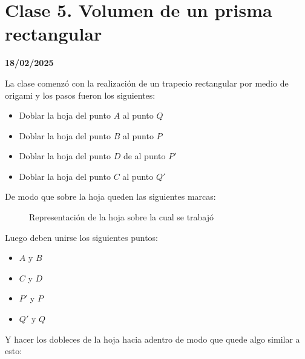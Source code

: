 \section{Clase 5. Volumen de un prisma rectangular}\label{chap:C5}
\textbf{18/02/2025}

La clase comenzó con la realización de un trapecio rectangular por medio de origami y los pasos fueron los siguientes:
\begin{itemize}
    \item Doblar la hoja del punto $A$ al punto $Q$
    \item Doblar la hoja del punto $B$ al punto $P$
    \item Doblar la hoja del punto $D$ de al punto $P'$
    \item Doblar la hoja del punto $C$ al punto $Q'$
\end{itemize}

De modo que sobre la hoja queden las siguientes marcas:

\begin{figure}[h!]
    \caption{Representación de la hoja sobre la cual se trabajó}
    \begin{center}
    \end{center}
\end{figure}

Luego deben unirse los siguientes puntos: 

\begin{itemize}
    \item $A$ y $B$
    \item $C$ y $D$
    \item $P'$ y $P$
    \item $Q'$ y $Q$
\end{itemize}
Y hacer los dobleces de la hoja hacia adentro de modo que quede algo similar a esto:

